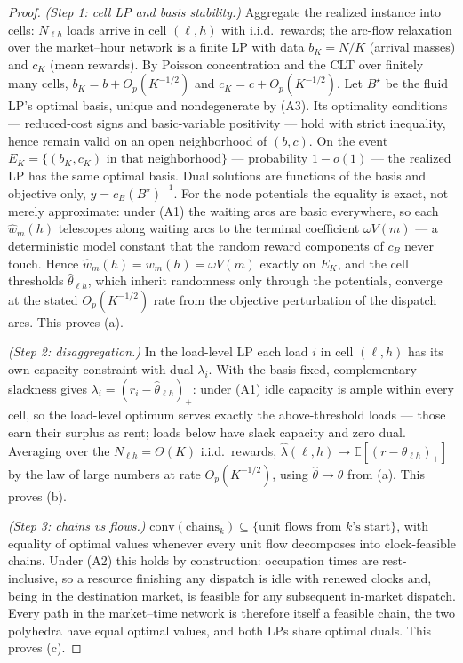 \documentclass[11pt]{article}
\begin{document}
\begin{proof}
\emph{(Step 1: cell LP and basis stability.)} Aggregate the realized
instance into cells: $N_{\ell h}$ loads arrive in cell $(\ell, h)$ with
i.i.d.\ rewards; the arc-flow relaxation over the market--hour network
is a finite LP with data $b_K = N/K$ (arrival masses) and $c_K$ (mean
rewards). By Poisson concentration and the CLT over finitely many cells,
$b_K = b + O_p(K^{-1/2})$ and $c_K = c + O_p(K^{-1/2})$. Let $B^{\star}$
be the fluid LP's optimal basis, unique and nondegenerate by (A3). Its
optimality conditions --- reduced-cost signs and basic-variable
positivity \citep[e.g.,][]{bertsimas1997introduction} --- hold with
strict inequality, hence remain valid on an open neighborhood of
$(b, c)$. On the event
$E_K = \{(b_K, c_K) \text{ in that neighborhood}\}$ --- probability
$1 - o(1)$ --- the realized LP has the same optimal basis. Dual
solutions are functions of the basis and objective only,
$y = c_B (B^{\star})^{-1}$. For the node potentials the equality is
exact, not merely approximate: under (A1) the waiting arcs are basic
everywhere, so each $\hat{w}_m(h)$ telescopes along waiting arcs to
the terminal coefficient $\omega V(m)$ --- a deterministic model
constant that the random reward components of $c_B$ never touch. Hence
$\hat{w}_m(h) = w_m(h) = \omega V(m)$ exactly on $E_K$, and the cell
thresholds $\hat{\theta}_{\ell h}$, which inherit randomness only
through the potentials, converge at the stated $O_p(K^{-1/2})$ rate
from the objective perturbation of the dispatch arcs. This proves (a).

\emph{(Step 2: disaggregation.)} In the load-level LP each load $i$ in
cell $(\ell, h)$ has its own capacity constraint with dual $\lambda_i$.
With the basis fixed, complementary slackness gives
$\lambda_i = (r_i - \hat{\theta}_{\ell h})_+$: under (A1) idle capacity
is ample within every cell, so the load-level optimum serves exactly
the above-threshold loads --- those earn their surplus as rent; loads
below have slack capacity and zero dual. Averaging over the
$N_{\ell h} = \Theta(K)$ i.i.d.\ rewards,
$\hat{\lambda}(\ell, h) \to \mathbb{E}[(r - \theta_{\ell h})_+]$ by the
law of large numbers at rate $O_p(K^{-1/2})$, using
$\hat{\theta} \to \theta$ from (a). This proves (b).

\emph{(Step 3: chains vs flows.)}
$\mathrm{conv}(\text{chains}_k) \subseteq \{\text{unit flows from } k
\text{'s start}\}$, with equality of optimal values whenever every
unit flow decomposes into clock-feasible chains. Under (A2) this holds
by construction: occupation times are rest-inclusive, so a resource
finishing any dispatch is idle with renewed clocks and, being in the
destination market, is feasible for any subsequent in-market dispatch.
Every path in the market--time network is therefore itself a feasible
chain, the two polyhedra have equal optimal values, and both LPs share
optimal duals. This proves (c).
\end{proof}
\end{document}
